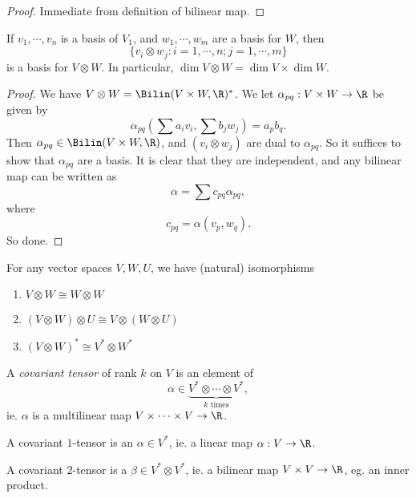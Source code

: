 \documentclass[a4paper]{article}
\begin{document}
\begin{proof}
  Immediate from definition of bilinear map.
\end{proof}

\begin{lemma}
  If $v_1,\cdots, v_n$ is a basis of $V_1$, and $w_1, \cdots, w_m$ are a basis for $W$, then
  \[
    \{v_i \otimes w_j: i = 1, \cdots, n; j = 1, \cdots, m\}
  \]
  is a basis for $V \otimes W$. In particular, $\dim V \otimes W = \dim V \times \dim W$.
\end{lemma}

\begin{proof}
  We have $V \otimes W = \Bilin(V \times W, \R)^*$. We let $\alpha_{pq}:V \times W \to \R$ be given by
  \[
    \alpha_{pq}\left(\sum a_i v_i, \sum b_j w_j\right) = a_p b_q.
  \]
  Then $\alpha_{pq} \in \Bilin(V\times W, \R)$, and $(v_i \otimes w_j)$ are dual to $\alpha_{pq}$. So it suffices to show that $\alpha_{pq}$ are a basis. It is clear that they are independent, and any bilinear map can be written as
  \[
    \alpha = \sum c_{pq}\alpha_{pq},
  \]
  where
  \[
    c_{pq} = \alpha(v_p, w_q).
  \]
  So done.
\end{proof}

\begin{prop}
  For any vector spaces $V, W, U$, we have (natural) isomorphisms
  \begin{enumerate}
    \item $V \otimes W \cong W \otimes W$
    \item $(V \otimes W) \otimes U \cong V \otimes (W \otimes U)$
    \item $(V \otimes W)^* \cong V^* \otimes W^*$
  \end{enumerate}
\end{prop}

\begin{defi}
  A \emph{covariant tensor} of rank $k$ on $V$ is an element of
  \[
    \alpha \in \underbrace{V^* \otimes \cdots \otimes V^*}_{k\text{ times}},
  \]
  ie. $\alpha$ is a multilinear map $V \times \cdots \times V \to \R$.
\end{defi}

\begin{eg}
  A covariant $1$-tensor is an $\alpha \in V^*$, ie. a linear map $\alpha: V \to \R$.

  A covariant $2$-tensor is a $\beta \in V^* \otimes V^*$, ie. a bilinear map $V \times V \to \R$, eg. an inner product.
\end{eg}
\end{document}
